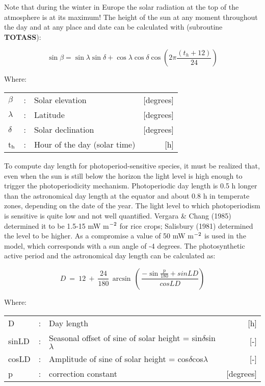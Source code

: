 Note that during the winter in Europe the solar radiation at the top of the atmo\-sphere is at 
its maximum! The height of the sun at any moment throughout the day and at any place and date can be
calculated with (subroutine {\bf TOTASS}):

\begin{equation}
\sin \beta = \sin \lambda \sin \delta + \cos \lambda \cos \delta \cos (2 \pi {\frac{(t _{h} +12)}{24}} )
\end{equation}

Where:\\[5pt]
\begin{tabularx}{\textwidth}{llXr}
$\beta$ &:& Solar elevation  & [degrees]\\
$\lambda$ &:& Latitude  & [degrees]\\
$\delta$ &:& Solar declination  & [degrees]\\
t$_{{\rm h}}$ &:& Hour of the day (solar time)  & [h]\\
\end{tabularx}

To compute day length for photoperiod-sensitive species, it must be realized that, even
when the sun is still below the horizon the light level is high enough to trigger the
photoperiodicity mechan\-ism. Photoperiodic day length is 0.5 h longer than the 
astronomi\-cal day length at the equator and about 0.8 h in temperate zones, depending 
on the date of the year. The light level to which photoperiodism is sensitive is quite low and not well
quantified. Vergara \& Chang (1985) determined it to be 1.5-15 mW m$^{{\rm -2}}$ for 
rice crops; Salisbury (1981) determined the level to be higher. As a compromise a value of 50 mW
m$^{{\rm -2}}$ is used in the model, which corresponds with a sun angle of -4 degrees. The
photosynthetic active period and the astro\-nomical day length can be calculated as:

\begin{equation}
\label{eq:AstroDaylength}
D ~=~ 12~+~{\frac{24}{180}} \, \arcsin \, (\,{\frac{-\sin {\frac{p}{180}} + sinLD}{cosLD}} )
\end{equation}

Where:\\[5pt]
\begin{tabularx}{\textwidth}{llXr}
D &:& Day length  & [h]\\
sinLD &:& Seasonal offset of sine of solar height = sin$\delta$sin$\lambda$  & [-]\\
cosLD &:& Amplitude of sine of solar height = cos$\delta$cos$\lambda$  & [-]\\
p &:& correction constant  & [degrees]\\
\end{tabularx}

